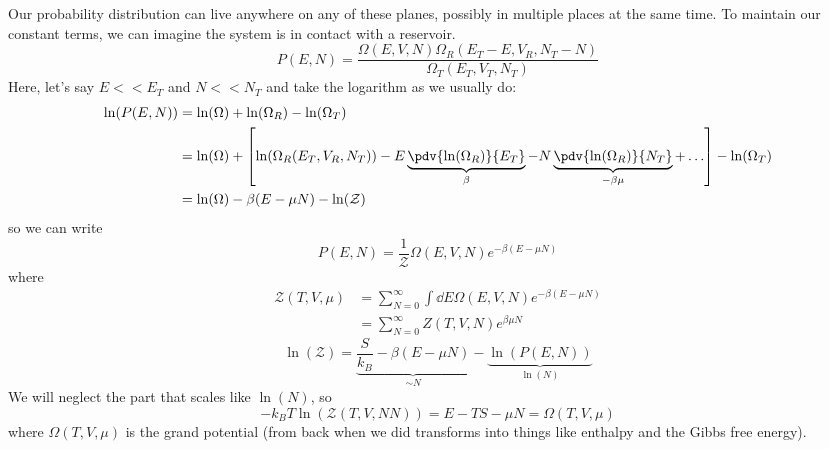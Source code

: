 \documentclass[a4paper,twoside,master.tex]{subfiles}
\begin{document}
Our probability distribution can live anywhere on any of these planes, possibly in multiple places at the same time. To maintain our constant terms, we can imagine the system is in contact with a reservoir.
\begin{equation}
    P(E,N) = \frac{\Omega(E,V,N) \Omega_R(E_T - E, V_R, N_T - N)}{\Omega_T(E_T, V_T, N_T)}
\end{equation}
Here, let's say $ E << E_T $ and $ N << N_T $ and take the logarithm as we usually do:
\begin{align}
    \ln(P(E,N)) &= \ln(\Omega) + \ln(\Omega_R) - \ln(\Omega_T) \\
    &= \ln(\Omega) + \left[ \ln(\Omega_R(E_T, V_R, N_T)) - E \underbrace{\pdv{\ln(\Omega_R)}{E_T}}_{\beta} - N \underbrace{\pdv{\ln(\Omega_R)}{N_T}}_{- \beta \mu} + \ldots \right] - \ln(\Omega_T) \\
    &= \ln(\Omega) - \beta (E - \mu N) - \ln(\mathcal{Z})
\end{align}
so we can write
\begin{equation}
    P(E,N) = \frac{1}{\mathcal{Z}} \Omega(E,V,N) e^{- \beta (E - \mu N)}
\end{equation}
where
\begin{align}
    \mathcal{Z}(T,V, \mu) &= \sum_{N=0}^{\infty} \int \dd{E} \Omega(E,V,N) e^{- \beta (E - \mu N)} \\
    &= \sum_{N=0}^{\infty} Z(T,V,N) e^{\beta \mu N}
\end{align}
\begin{equation}
    \ln(\mathcal{Z}) = \underbrace{\frac{S}{k_B} - \beta (E - \mu N)}_{\sim N} - \underbrace{\ln(P(E,N))}_{\ln(N)}
\end{equation}
We will neglect the part that scales like $ \ln(N) $, so
\begin{equation}
    - k_B T \ln(\mathcal{Z}(T,V,NN)) = E - TS - \mu N = \Omega(T,V, \mu)
\end{equation}
where $ \Omega(T,V, \mu) $ is the grand potential (from back when we did transforms into things like enthalpy and the Gibbs free energy).
\end{document}
